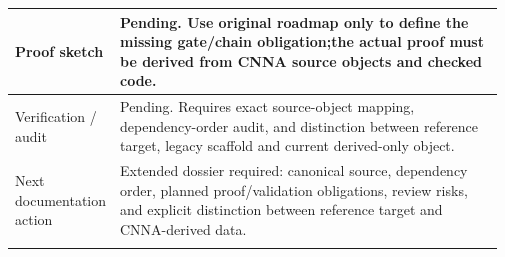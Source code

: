\begin{longtable}{L{0.16\linewidth} L{0.81\linewidth}}
\hline\addlinespace[0.20em]
Proof sketch & Pending. Use original roadmap only to define the missing gate/\allowbreak{}chain obligation;\newline the actual proof must be derived from CNNA source objects and checked code.\\
\hline\addlinespace[0.20em]
Verification /\allowbreak{} audit & Pending. Requires exact source-object mapping, dependency-order audit, and distinction between reference target, legacy scaffold and current derived-only object.\\
\hline\addlinespace[0.20em]
Next documentation action & Extended dossier required: canonical source, dependency order, planned proof/\allowbreak{}validation obligations, review risks, and explicit distinction between reference target and CNNA-derived data.\\
\hline\addlinespace[0.20em]
\end{longtable}
